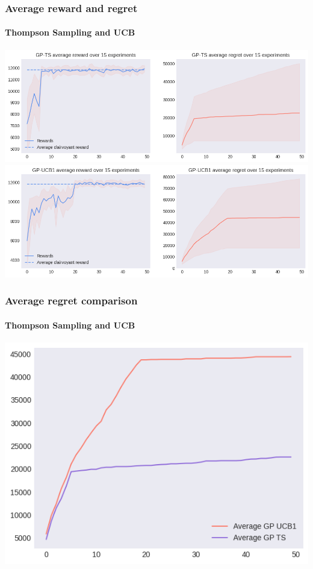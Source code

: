 \begin{frame}[plain]

\frametitle{Average reward and regret}
\framesubtitle{Thompson Sampling and UCB}

\begin{center}
	\hspace*{-1em}
	\includegraphics[scale=0.42]{img/Graphs/uncertain_alpha/image4.png}
	\hspace*{-1em}
	\includegraphics[scale=0.42]{img/Graphs/uncertain_alpha/image5.png}
\end{center}

\end{frame}


\begin{frame}[plain]

\frametitle{Average regret comparison}
\framesubtitle{Thompson Sampling and UCB}

\begin{center}
	\hspace*{-2.8em}
	\includegraphics[scale=0.55]{img/Graphs/uncertain_alpha/image6.png}
\end{center}

\end{frame}

